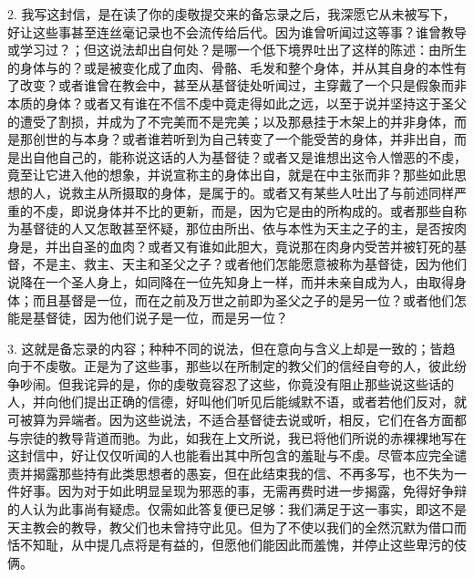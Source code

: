 2. 我写这封信，是在读了你的虔敬提交来的备忘录之后，我深愿它从未被写下，好让这些事甚至连丝毫记录也不会流传给后代。因为谁曾听闻过这等事？谁曾教导或学习过？；但这说法却出自何处？是哪一个低下境界吐出了这样的陈述：由所生的身体与的？或是被变化成了血肉、骨骼、毛发和整个身体，并从其自身的本性有了改变？或者谁曾在教会中，甚至从基督徒处听闻过，主穿戴了一个只是假象而非本质的身体？或者又有谁在不信不虔中竟走得如此之远，以至于说并坚持这于圣父的遭受了割损，并成为了不完美而不是完美；以及那悬挂于木架上的并非身体，而是那创世的与本身？或者谁若听到为自己转变了一个能受苦的身体，并非出自，而是出自他自己的，能称说这话的人为基督徒？或者又是谁想出这令人憎恶的不虔，竟至让它进入他的想象，并说宣称主的身体出自，就是在中主张而非？那些如此思想的人，说救主从所摄取的身体，是属于的。或者又有某些人吐出了与前述同样严重的不虔，即说身体并不比的更新，而是，因为它是由的所构成的。或者那些自称为基督徒的人又怎敢甚至怀疑，那位由所出、依与本性为天主之子的主，是否按肉身是，并出自圣的血肉？或者又有谁如此胆大，竟说那在肉身内受苦并被钉死的基督，不是主、救主、天主和圣父之子？或者他们怎能愿意被称为基督徒，因为他们说降在一个圣人身上，如同降在一位先知身上一样，而并未亲自成为人，由取得身体；而且基督是一位，而在之前及万世之前即为圣父之子的是另一位？或者他们怎能是基督徒，因为他们说子是一位，而是另一位？\par

3. 这就是备忘录的内容；种种不同的说法，但在意向与含义上却是一致的；皆趋向于不虔敬。正是为了这些事，那些以在所制定的教父们的信经自夸的人，彼此纷争吵闹。但我诧异的是，你的虔敬竟容忍了这些，你竟没有阻止那些说这些话的人，并向他们提出正确的信德，好叫他们听见后能缄默不语，或者若他们反对，就可被算为异端者。因为这些说法，不适合基督徒去说或听，相反，它们在各方面都与宗徒的教导背道而驰。为此，如我在上文所说，我已将他们所说的赤裸裸地写在这封信中，好让仅仅听闻的人也能看出其中所包含的羞耻与不虔。尽管本应完全谴责并揭露那些持有此类思想者的愚妄，但在此结束我的信、不再多写，也不失为一件好事。因为对于如此明显呈现为邪恶的事，无需再费时进一步揭露，免得好争辩的人认为此事尚有疑虑。仅需如此答复便已足够：我们满足于这一事实，即这不是天主教会的教导，教父们也未曾持守此见。但为了不使以我们的全然沉默为借口而恬不知耻，从中提几点将是有益的，但愿他们能因此而羞愧，并停止这些卑污的伎俩。\par


